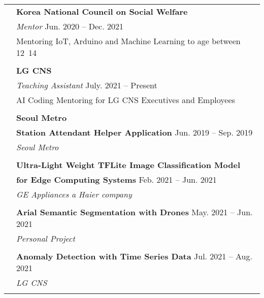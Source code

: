 \documentclass[letterpaper, 11pt]{article}
\begin{document}
\begin{longtable}{p{1.3in}p{4.8in}}
{\color{Violet}{Teaching experience}} 
& \textbf{Korea National Council on Social Welfare} \\ 
& {\it Mentor} \hfill  Jun. 2020 -- Dec. 2021 \\
& Mentoring IoT, Arduino and Machine Learning to age between 12~14 \\
& \\
& \textbf{LG CNS} \\ 
& {\it Teaching Assistant} \hfill  July. 2021 -- Present \\
& AI Coding Mentoring for LG CNS Executives and Employees\\
& \\



{\color{Violet}{Project experience}} 
& {\textbf{Seoul Metro}} \\
& {\textbf{Station Attendant Helper Application}} \hfill Jun. 2019 -- Sep. 2019 \\
& {\it Seoul Metro}  \\
& \\

& {\textbf{Ultra-Light Weight TFLite Image Classification Model}} \\
& {\textbf{for Edge Computing Systems}} \hfill Feb. 2021 -- Jun. 2021 \\
& {\it GE Appliances a Haier company}  \\
& \\

& {\textbf{Arial Semantic Segmentation with Drones}} \hfill May. 2021 -- Jun. 2021 \\
& {\it Personal Project} \\
& \\

& {\textbf{Anomaly Detection with Time Series Data}} \hfill Jul. 2021 -- Aug. 2021 \\
& {\it LG CNS} \\
& \\



\end{longtable}
\end{document}
